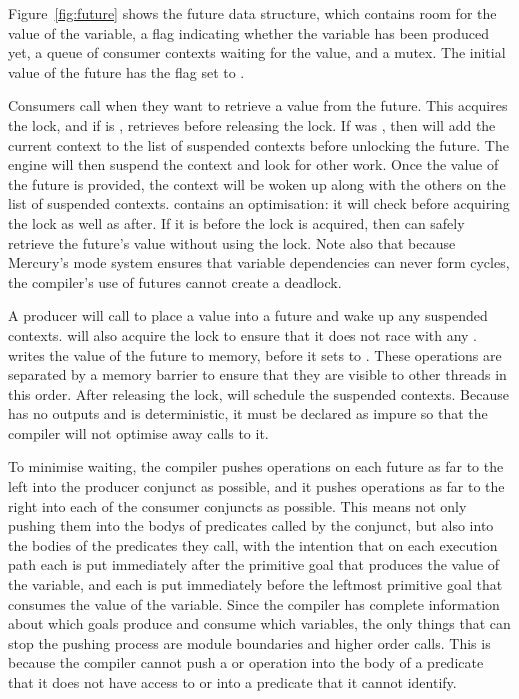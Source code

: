 Figure~\ref{fig:future} shows the future data structure,
which contains room for the value of the variable,
a flag indicating whether the variable has been produced yet,
a queue of consumer contexts waiting for the value, and a mutex.
The initial value of the future has the flag set to
.

Consumers call \wait when they want to retrieve a value from the future.
This acquires the lock, and if  is 
, retrieves
 before releasing the lock.
If  was ,
then \wait will add the current context to
the list of suspended contexts before unlocking the future.
The engine will then suspend the context and look for other work.
Once the value of the future is provided,
the context will be woken up along with the others on the list of suspended
contexts.
\wait contains an optimisation:
it will check  before
acquiring the lock as well as after.
If it is  before the lock is acquired,
then \wait can safely retrieve the
future's value without using the lock.
Note also that because Mercury's mode system ensures that variable
dependencies can never form cycles,
the compiler's use of futures cannot create a deadlock.

A producer will call \signal to place a value into a future and wake up any
suspended contexts.
\signal will also acquire the lock to ensure that it does not race with any \wait.
\signal writes the value of the future to memory,
before it sets 
 to .
These operations are separated by a memory barrier to ensure that they are
visible to other threads in this order.
After releasing the lock, \signal will schedule the suspended contexts.
Because \signal has no outputs and is deterministic,
it must be declared as impure so that the compiler will not optimise away calls
to it.

To minimise waiting,
the compiler pushes \signal operations on each future
as far to the left into the producer conjunct as possible,
and it pushes \wait operations
as far to the right into each of the consumer conjuncts as possible.
This means not only pushing them
into the bodys of predicates called by the conjunct,
but also into the bodies of the predicates they call,
with the intention that on each execution path
each \signal is put immediately after
the primitive goal that produces the value of the variable,
and each \wait is put immediately before
the leftmost primitive goal that consumes the value of the variable.
Since the compiler has complete information
about which goals produce and consume which variables,
the only things that can stop the pushing process
are module boundaries and  higher order calls.
This is because
the compiler cannot push a \wait or \signal operation
into the body of a predicate that it does not have access to
or into a predicate that it cannot identify.

